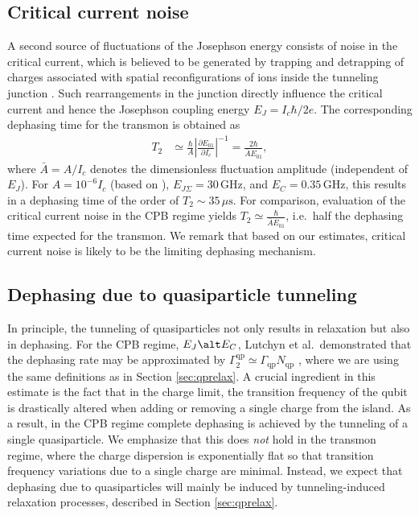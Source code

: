 \documentclass[twocolumn,amsmath,amssymb,floatfix,pra,showpacs,eqsecnum,footinbib,superscriptaddress]{revtex4}
\newcounter{fig}
\newcommand{\abs}[1]{\left|#1\right|}
\begin{document}
\subsection{Critical current noise}
A second source of fluctuations of the Josephson energy consists of noise in the critical current, which is believed to be generated by trapping and detrapping of charges associated with spatial reconfigurations of ions inside the tunneling junction \cite{harlingen}. Such rearrangements in the junction directly influence the critical current and hence the Josephson coupling energy $E_J=I_c \hbar/2e$. The corresponding dephasing time for the transmon is obtained as
\begin{align}\label{Icdeph}
T_2&\simeq \frac{\hbar}{A}\abs{\frac{\partial E_{01}}{\partial I_c}}^{-1}
= \frac{2\hbar}{\bar{A}E_{01}},
\end{align}
where $\bar{A}=A/I_c$ denotes the dimensionless fluctuation amplitude (independent of $E_J$).
For $A=10^{-6}I_c$ (based on \cite{harlingen}),  $E_{J\Sigma}=30\,\text{GHz}$, and $E_C=0.35\,\text{GHz}$, this results in a dephasing time of the order of $T_2\sim35\,\mu\text{s}$. For comparison, evaluation of the critical current noise in the CPB regime yields $T_2\simeq \frac{\hbar}{\bar{A}E_{01}}$, i.e.\ half the dephasing time expected for the transmon. We remark that based on our estimates, critical current noise is likely to be the limiting dephasing mechanism. 

\subsection{Dephasing due to quasiparticle tunneling}
In principle, the tunneling of quasiparticles not only results in relaxation but also in dephasing. For the CPB regime, $E_J\alt E_C$, Lutchyn et al.\ demonstrated that the dephasing rate may be approximated by $\Gamma_2^\text{qp}\simeq \Gamma_\text{qp}N_\text{qp}$ \cite{lutchyn2}, where we are using the same definitions as in Section \ref{sec:qprelax}. A crucial ingredient in this estimate is the fact that in the charge limit, the transition frequency of the qubit is drastically altered when adding or removing a single charge from the island. As a result, in the CPB regime complete dephasing is achieved by the tunneling of a single quasiparticle. We emphasize that this does \emph{not} hold in the transmon regime, where the charge dispersion is exponentially flat so that transition frequency variations due to a single charge are minimal. Instead, we expect that dephasing due to quasiparticles will mainly be induced by tunneling-induced relaxation processes, described in Section \ref{sec:qprelax}.
\end{document}
